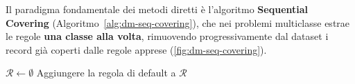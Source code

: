 Il paradigma fondamentale dei metodi diretti \`e l'algoritmo \textbf{Sequential Covering} (Algoritmo~\ref{alg:dm-seq-covering}), che nei problemi multiclasse estrae le regole \textbf{una classe alla volta}, rimuovendo progressivamente dal dataset i record gi\`a coperti dalle regole apprese (\autoref{fig:dm-seq-covering}).

\begin{algorithm}[H]
\caption{Algoritmo Sequential Covering}
\label{alg:dm-seq-covering}
$\mathcal{R} \leftarrow \emptyset$\;
Aggiungere la regola di default a $\mathcal{R}$\;
\end{algorithm}


